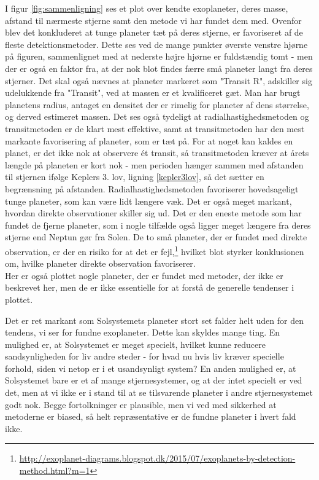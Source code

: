 I figur \ref{fig:sammenligning} ses et plot over kendte exoplaneter, deres masse, afstand til nærmeste stjerne samt den metode vi har fundet dem med. Ovenfor blev det konkluderet at tunge planeter tæt på deres stjerne, er favoriseret af de fleste detektionsmetoder. Dette ses ved de mange punkter øverste venstre hjørne på figuren, sammenlignet med at nederste højre hjørne er fuldstændig tomt - men der er også en faktor fra, at der nok blot findes færre små planeter langt fra deres stjerner.  Det skal også nævnes at planeter markeret som "Transit R", adskiller sig udelukkende fra "Transit", ved at massen er et kvalificeret gæt. Man har brugt planetens radius, antaget en densitet der er rimelig for planeter af dens størrelse, og derved estimeret massen. Det ses også tydeligt at radialhastighedsmetoden og transitmetoden er de klart mest effektive, samt at transitmetoden har den mest markante favorisering af planeter, som er tæt på. For at noget kan kaldes en planet, er det ikke nok at observere ét transit, så transitmetoden kræver at årets længde på planeten er kort nok - men perioden hænger sammen med afstanden til stjernen ifølge  Keplers 3. lov, ligning \ref{kepler3lov}, så det sætter en begrænsning på afstanden. Radialhastighedsmetoden favoriserer hovedsageligt tunge planeter, som kan være lidt længere væk.  %
Det er også meget markant, hvordan direkte observationer skiller sig ud. Det er den eneste metode som har fundet de fjerne planeter, som i nogle tilfælde også ligger meget længere fra deres stjerne end Neptun gør fra Solen. De to små planeter, der er fundet med direkte observation, er der en risiko for at det er fejl,\footnote{\url{http://exoplanet-diagrams.blogspot.dk/2015/07/exoplanets-by-detection-method.html?m=1}} hvilket blot styrker konklusionen om, hvilke planeter direkte observation favoriserer. \\
Her er også plottet nogle planeter, der er fundet med metoder, der ikke er beskrevet her, men de er ikke essentielle for at forstå de generelle tendenser i plottet.

Det er ret markant som Solsystemets planeter stort set falder helt uden for den tendens, vi ser for fundne exoplaneter. Dette kan skyldes mange ting. En mulighed er, at Solsystemet er meget specielt, hvilket kunne reducere sandsynligheden for liv andre steder - for hvad nu hvis liv kræver specielle forhold, siden vi netop er i et usandsynligt system? En anden mulighed er, at Solsystemet bare er et af mange stjernesystemer, og at der intet specielt er ved det, men at vi ikke er i stand til at se tilsvarende planeter i andre stjernesystemet godt nok. Begge fortolkninger er plausible, men vi ved med sikkerhed at metoderne er biased, så helt repræsentative er de fundne planeter i hvert fald ikke.